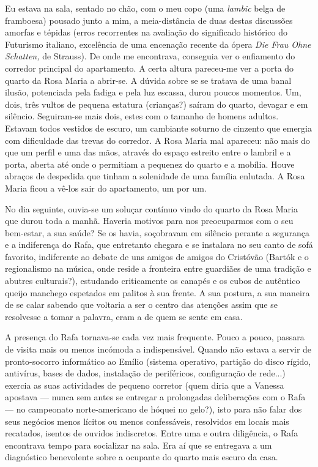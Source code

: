 Eu estava na sala, sentado no chão, com o meu copo (uma
\emph{lambic }belga de framboesa) pousado junto a mim, a meia-distância de duas destas discussões amorfas e tépidas (erros
recorrentes na avaliação do significado histórico do Futurismo italiano,
excelência de uma encenação recente da ópera \emph{Die Frau Ohne
Schatten, }de Strauss). De onde me encontrava, conseguia ver o
enfiamento do corredor principal do apartamento. A certa altura
pareceu-me ver a porta do quarto da Rosa Maria a abrir-se. A dúvida
sobre se se tratava de uma banal ilusão, potenciada pela fadiga e pela
luz escassa, durou poucos momentos. Um, dois, três vultos de pequena
estatura (crianças?) saíram do quarto, devagar e em silêncio. Seguiram-se mais dois,
estes com o tamanho de homens adultos. Estavam todos vestidos de escuro,
um cambiante soturno de cinzento que emergia com dificuldade das trevas
do corredor. A Rosa Maria mal apareceu: não mais do que um perfil e uma
das mãos, através do espaço estreito entre o lambril e a porta, aberta
até onde o permitiam a pequenez do quarto e a mobília. Houve abraços de
despedida que tinham a solenidade de uma família enlutada. A Rosa Maria
ficou a vê-los sair do apartamento, um por um.

No dia seguinte, ouvia-se um soluçar contínuo vindo do quarto da Rosa
Maria que durou toda a manhã. Haveria motivos para nos preocuparmos
com o seu bem-estar, a sua saúde? Se os havia, soçobravam em silêncio
perante a segurança e a indiferença do Rafa, que entretanto chegara e se
instalara no seu canto de sofá favorito, indiferente ao debate de uns
amigos de amigos do Cristóvão (Bartók e o regionalismo na música, onde
reside a fronteira entre guardiães de uma tradição e abutres
culturais?), estudando criticamente os canapés e os cubos de autêntico
queijo manchego espetados em palitos à sua frente. A sua postura, a sua
maneira de se calar sabendo que voltaria a ser o centro das atenções
assim que se resolvesse a tomar a palavra, eram a de quem se sente em
casa.

A presença do Rafa tornava-se cada vez mais frequente. Pouco a pouco,
passara de visita mais ou menos incómoda a indispensável. Quando não
estava a servir de pronto-socorro informático ao Emílio (sistema
operativo, partição do disco rígido, antivírus, bases de dados,
instalação de periféricos, configuração de rede...) exercia as suas
actividades de pequeno corretor (quem diria que a Vanessa apostava ---
nunca sem antes se entregar a prolongadas deliberações com o Rafa --- no
campeonato norte-americano de hóquei no gelo?), isto para não falar dos
seus negócios menos lícitos ou menos confessáveis, resolvidos em
locais mais recatados, isentos de ouvidos indiscretos. Entre uma e outra
diligência, o Rafa encontrava tempo para socializar na sala. Era aí que
se entregava a um diagnóstico benevolente sobre a ocupante do quarto
mais escuro da casa.

